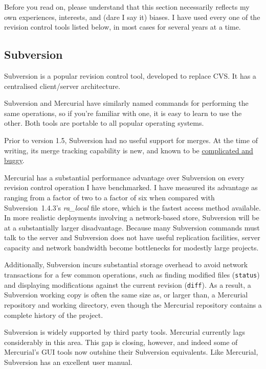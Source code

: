 Before you read on, please understand that this section necessarily
reflects my own experiences, interests, and (dare I say it) biases.  I
have used every one of the revision control tools listed below, in
most cases for several years at a time.


\subsection{Subversion}

Subversion is a popular revision control tool, developed to replace
CVS.  It has a centralised client/server architecture.

Subversion and Mercurial have similarly named commands for performing
the same operations, so if you're familiar with one, it is easy to
learn to use the other.  Both tools are portable to all popular
operating systems.

Prior to version 1.5, Subversion had no useful support for merges.
At the time of writing, its merge tracking capability is new, and known to be
\href{http://svnbook.red-bean.com/nightly/en/svn.branchmerge.advanced.html#svn.branchmerge.advanced.finalword}{complicated
  and buggy}.

Mercurial has a substantial performance advantage over Subversion on
every revision control operation I have benchmarked.  I have measured
its advantage as ranging from a factor of two to a factor of six when
compared with Subversion~1.4.3's \emph{ra\_local} file store, which is
the fastest access method available.  In more realistic deployments
involving a network-based store, Subversion will be at a substantially
larger disadvantage.  Because many Subversion commands must talk to
the server and Subversion does not have useful replication facilities,
server capacity and network bandwidth become bottlenecks for modestly
large projects.

Additionally, Subversion incurs substantial storage overhead to avoid
network transactions for a few common operations, such as finding
modified files (\texttt{status}) and displaying modifications against
the current revision (\texttt{diff}).  As a result, a Subversion
working copy is often the same size as, or larger than, a Mercurial
repository and working directory, even though the Mercurial repository
contains a complete history of the project.

Subversion is widely supported by third party tools.  Mercurial
currently lags considerably in this area.  This gap is closing,
however, and indeed some of Mercurial's GUI tools now outshine their
Subversion equivalents.  Like Mercurial, Subversion has an excellent
user manual.

